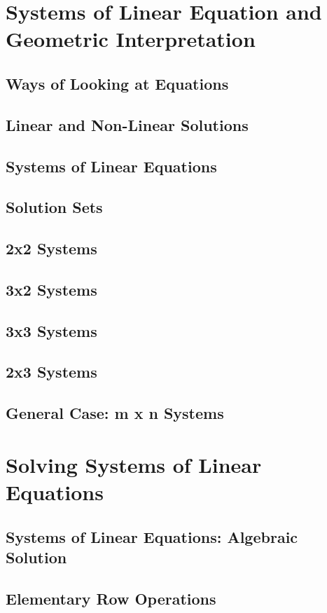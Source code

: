 \documentclass[11pt]{article}
\begin{document}
\setcounter{section}{1}
\section{Systems of Linear Equation and Geometric Interpretation}
\subsection{Ways of Looking at Equations}
\subsection{Linear and Non-Linear Solutions}
\subsection{Systems of Linear Equations}
\subsection{Solution Sets}
\subsection{2x2 Systems}
\subsection{3x2 Systems}
\subsection{3x3 Systems}
\subsection{2x3 Systems}
\subsection{General Case: m x n Systems}

\setcounter{section}{2}
\section{Solving Systems of Linear Equations}
\subsection{Systems of Linear Equations: Algebraic Solution}
\subsection{Elementary Row Operations}
\end{document}
